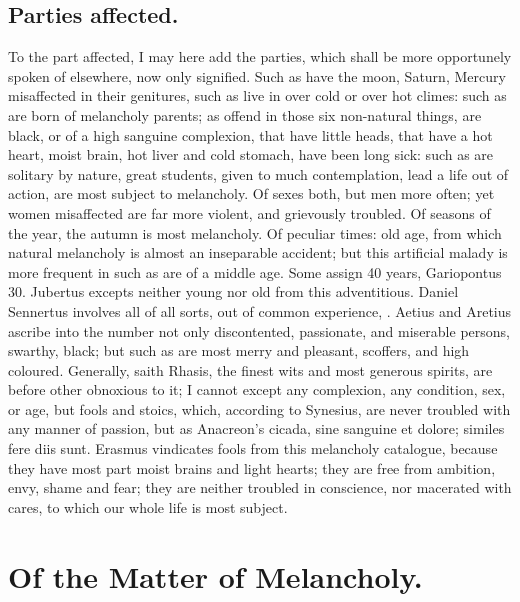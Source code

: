 {{\subsection{Parties affected.}
To the part affected, I may here add the parties,
which shall be more opportunely spoken of elsewhere, now only
signified. Such as have the moon, Saturn, Mercury misaffected in their
genitures, such as live in over cold or over hot climes: such as are
born of melancholy parents; as offend in those six non-natural things,
are black, or of a high sanguine complexion, that have little
heads, that have a hot heart, moist brain, hot liver and cold stomach,
have been long sick: such as are solitary by nature, great students,
given to much contemplation, lead a life out of action, are most
subject to melancholy. Of sexes both, but men more often; yet
women misaffected are far more violent, and grievously troubled.
Of seasons of the year, the autumn is most melancholy. Of peculiar
times: old age, from which natural melancholy is almost an inseparable
accident; but this artificial malady is more frequent in such as are of
a middle age. Some assign 40 years, Gariopontus 30. Jubertus
excepts neither young nor old from this adventitious. Daniel Sennertus
involves all of all sorts, out of common experience, . Aetius and
Aretius ascribe into the number not only discontented,
passionate, and miserable persons, swarthy, black; but such as are most
merry and pleasant, scoffers, and high coloured. Generally, saith
Rhasis, the finest wits and most generous spirits, are before
other obnoxious to it; I cannot except any complexion, any condition,
sex, or age, but fools and stoics, which, according to
Synesius, are never troubled with any manner of passion, but as
Anacreon's cicada, sine sanguine et dolore; similes fere diis sunt.
Erasmus vindicates fools from this melancholy catalogue, because they
have most part moist brains and light hearts; they are free from
ambition, envy, shame and fear; they are neither troubled in
conscience, nor macerated with cares, to which our whole life is most
subject.

\section{Of the Matter of Melancholy.}

}}
